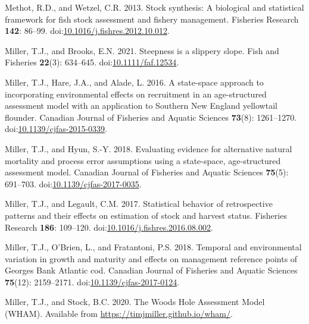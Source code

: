 \documentclass[
  12pt,
]{article}
\newlength{\cslhangindent}
\newlength{\cslentryspacingunit} %
\newenvironment{CSLReferences}[2] %
 {%
  \setlength{\parindent}{0pt}
  \ifodd #1
  \let\oldpar\par
  \def\par{\hangindent=\cslhangindent\oldpar}
  \fi
  \setlength{\parskip}{#2\cslentryspacingunit}
 }%
 {}
\begin{document}
\begin{CSLReferences}{1}{0}
\leavevmode{}%
Methot, R.D., and Wetzel, C.R. 2013. Stock synthesis: A biological and
statistical framework for fish stock assessment and fishery management.
Fisheries Research \textbf{142}: 86--99.
doi:\href{https://doi.org/10.1016/j.fishres.2012.10.012}{10.1016/j.fishres.2012.10.012}.

\leavevmode{}%
Miller, T.J., and Brooks, E.N. 2021. Steepness is a slippery slope. Fish
and Fisheries \textbf{22}(3): 634--645.
doi:\href{https://doi.org/10.1111/faf.12534}{10.1111/faf.12534}.

\leavevmode{}%
Miller, T.J., Hare, J.A., and Alade, L. 2016. A state-space approach to
incorporating environmental effects on recruitment in an age-structured
assessment model with an application to {S}outhern {N}ew {E}ngland
yellowtail flounder. Canadian Journal of Fisheries and Aquatic Sciences
\textbf{73}(8): 1261--1270.
doi:\href{https://doi.org/10.1139/cjfas-2015-0339}{10.1139/cjfas-2015-0339}.

\leavevmode{}%
Miller, T.J., and Hyun, S.-Y. 2018. Evaluating evidence for alternative
natural mortality and process error assumptions using a state-space,
age-structured assessment model. Canadian Journal of Fisheries and
Aquatic Sciences \textbf{75}(5): 691--703.
doi:\href{https://doi.org/10.1139/cjfas-2017-0035}{10.1139/cjfas-2017-0035}.

\leavevmode{}%
Miller, T.J., and Legault, C.M. 2017. Statistical behavior of
retrospective patterns and their effects on estimation of stock and
harvest status. Fisheries Research \textbf{186}: 109--120.
doi:\href{https://doi.org/10.1016/j.fishres.2016.08.002}{10.1016/j.fishres.2016.08.002}.

\leavevmode{}%
Miller, T.J., O'Brien, L., and Fratantoni, P.S. 2018. Temporal and
environmental variation in growth and maturity and effects on management
reference points of {G}eorges {B}ank {A}tlantic cod. Canadian Journal of
Fisheries and Aquatic Sciences \textbf{75}(12): 2159--2171.
doi:\href{https://doi.org/10.1139/cjfas-2017-0124}{10.1139/cjfas-2017-0124}.

\leavevmode{}%
Miller, T.J., and Stock, B.C. 2020. The {Woods Hole Assessment Model}
({WHAM}). Available from \url{https://timjmiller.github.io/wham/}.


\end{CSLReferences}
\end{document}
